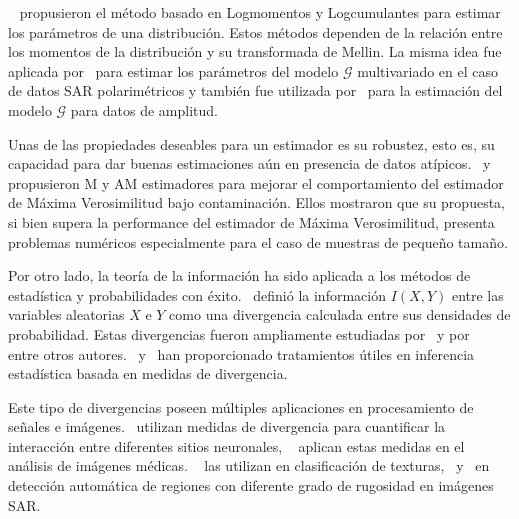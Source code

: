~\citet{nicolas2002} propusieron el método basado en Logmomentos y Logcumulantes para estimar los parámetros de una distribución. Estos métodos dependen de la relación entre los momentos de la distribución y su transformada de Mellin. La misma idea fue aplicada por~\citet{khan2014} para estimar los parámetros del modelo $\mathcal{G}$ multivariado en el caso de datos SAR polarimétricos y también fue utilizada por~\citet{Tison2004} para la estimación del modelo $\mathcal{G}$ para datos de amplitud.

Unas de las propiedades deseables para un estimador es su robustez, esto es, su capacidad para dar buenas estimaciones aún en presencia de datos atípicos.~\citet{BustosFreryLucini:Mestimators:2001} y~\citet{AllendeFreryetal:JSCS:05} propusieron M y AM estimadores para mejorar el comportamiento del estimador de Máxima Verosimilitud bajo contaminación. Ellos mostraron que su propuesta, si bien supera la performance del estimador de Máxima Verosimilitud, presenta problemas numéricos especialmente para el caso de muestras de pequeño tamaño.

Por otro lado, la teoría de la información ha sido aplicada a los métodos de estadística y probabilidades con éxito.~\citet{Shannon1948} definió la información $I(X,Y)$ entre las variables aleatorias $X$ e $Y$ como una divergencia calculada entre sus densidades de probabilidad. 
Estas divergencias fueron ampliamente estudiadas por~\citet{KullbackLeibler1951} y por~\citet{renyi1961} entre otros autores.~\citet{pardo2005statistical} y~\citet{Basu2011} han proporcionado tratamientos útiles en inferencia estadística basada en medidas de divergencia.

Este tipo de divergencias poseen múltiples aplicaciones en procesamiento de señales e imágenes.~\citet{Aviyente2007} utilizan medidas de divergencia para cuantificar la interacción entre diferentes sitios neuronales, ~\citet{5599869} aplican estas medidas en el análisis de imágenes médicas.
~\citet{1246862} las utilizan en clasificación de texturas,~\citet{6377288} y~\citet{ClassificationPolSARSegmentsMinimizationWishartDistances} en detección automática de regiones con diferente grado de rugosidad en imágenes SAR.


